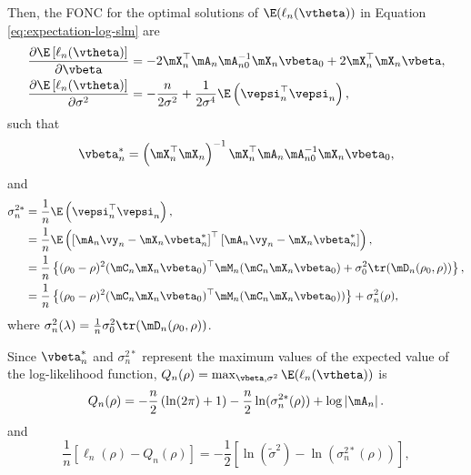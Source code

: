 \documentclass[english,12pt]{book}\usepackage[]{graphicx}\usepackage[]{xcolor}
\begin{document}
\begin{subappendices}
Then, the FONC for the optimal solutions of $\E(\ell_n(\vtheta))$ in Equation \eqref{eq:expectation-log-slm} are
\begin{equation*}
\begin{aligned}
\frac{\partial  \E\left[\ell_n(\vtheta)\right]}{\partial \vbeta} & = -2\mX_n^\top\mA_n\mA_{n0}^{-1}\mX_n\vbeta_0 +  2\mX_n^\top\mX_n\vbeta, \\
\frac{\partial  \E\left[\ell_n(\vtheta)\right]}{\partial \sigma^2} & = -\frac{n}{2\sigma^2} + \frac{1}{2\sigma^4}\E\left(\vepsi_n^\top\vepsi_n\right), 
\end{aligned}
\end{equation*}
%
such that
\begin{equation*}
\vbeta_n^*  = \left(\mX_n^\top\mX_n\right)^{-1}\mX_n^\top\mA_n\mA_{n0}^{-1}\mX_n\vbeta_0,
\end{equation*}
and 
\begin{equation}\label{eq:sigma-star-consistency}
\begin{aligned}
\sigma^{2*}_n  &  = \frac{1}{n}\E\left(\vepsi_n^\top\vepsi_n\right), \\
               & =  \frac{1}{n}\E\left(\left[\mA_n\vy_n - \mX_n\vbeta_n^*\right]^\top \left[\mA_n\vy_n - \mX_n\vbeta_n^*\right]\right), \\
               &= \frac{1}{n}\left\lbrace (\rho_0 - \rho)^2(\mC_n\mX_n\vbeta_0)^\top \mM_n(\mC_n\mX_n\vbeta_0) + \sigma_0^2\tr(\mD_n(\rho_0, \rho)) \right\rbrace, \\
               & = \frac{1}{n}\left\lbrace (\rho_0 - \rho)^2(\mC_n\mX_n\vbeta_0)^\top \mM_n(\mC_n\mX_n\vbeta_0))\right\rbrace + \sigma_n^2(\rho), 
\end{aligned}
\end{equation}
%
where $\sigma_n^2(\lambda) = \frac{1}{n}\sigma_0^2\tr(\mD_n(\rho_0, \rho))$.

Since $\vbeta^*_n$ and $\sigma_n^{2*}$ represent the maximum values of the expected value of the log-likelihood function, $Q_n(\rho) = \max_{\vbeta, \sigma^2}\E(\ell_n(\vtheta))$ is 
\begin{equation*}
  Q_n(\rho) = -\frac{n}{2}\left(\ln(2\pi) + 1\right) - \frac{n}{2}\ln(\sigma^{2*}_n(\rho)) + \log\left|\mA_n\right|.
\end{equation*}
%
and
\begin{equation*}
\frac{1}{n}\left[\ell_n(\rho) - Q_n(\rho)\right] = -\frac{1}{2}\left[\ln( \widetilde{\sigma}^{2}) - \ln(\sigma^{2*}_n(\rho)) \right],
\end{equation*}


\end{subappendices}
\end{document}
